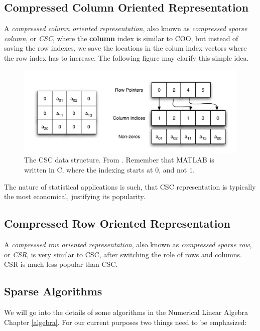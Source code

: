 \documentclass[]{book}
\theoremstyle{definition}
\theoremstyle{definition}
\theoremstyle{remark}
\begin{document}
\subsection{Compressed Column Oriented
Representation}\label{compressed-column-oriented-representation}

A \emph{compressed column oriented representation}, also known as
\emph{compressed sparse column}, or \emph{CSC}, where the
\textbf{column} index is similar to COO, but instead of saving the row
indexes, we save the locations in the colum index vectors where the row
index has to increase. The following figure may clarify this simple
idea.

\begin{figure}[htbp]
\centering
\includegraphics{art/crc.png}
\caption{The CSC data structure. From \citet{shah2004sparse}. Remember
that MATLAB is written in C, where the indexing starts at \(0\), and not
\(1\).}
\end{figure}

The nature of statistical applications is such, that CSC representation
is typically the most economical, justifying its popularity.

\subsection{Compressed Row Oriented
Representation}\label{compressed-row-oriented-representation}

A \emph{compressed row oriented representation}, also known as
\emph{compressed sparse row}, or \emph{CSR}, is very similar to CSC,
after switching the role of rows and columns. CSR is much less popular
than CSC.

\subsection{Sparse Algorithms}\label{sparse-algorithms}

We will go into the details of some algorithms in the Numerical Linear
Algebra Chapter \ref{algebra}. For our current purposes two things need
to be emphasized:
\end{document}
